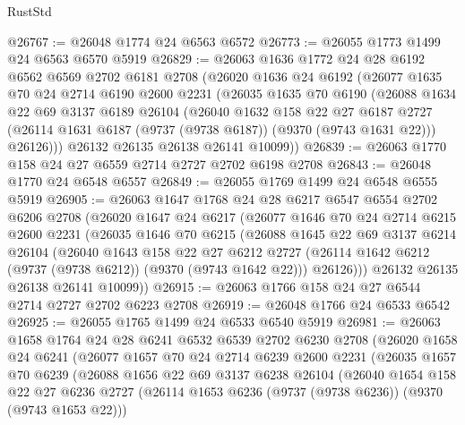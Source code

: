 \begin{lexlean}{RustStd}
\begin{coremodule}
@26767 := @26048 @1774 @24 @6563 @6572
@26773 := @26055 @1773 @1499 @24 @6563 @6570 @5919
@26829 := @26063
    @1636
    @1772
    @24
    @28
    @6192
    @6562
    @6569
    @2702
    @6181
    @2708
    (@26020
      @1636
      @24
      @6192
      (@26077
        @1635
        @70
        @24
        @2714
        @6190
        @2600
        @2231
        (@26035
          @1635
          @70
          @6190
          (@26088
            @1634
            @22
            @69
            @3137
            @6189
            @26104
            (@26040
              @1632
              @158
              @22
              @27
              @6187
              @2727
              (@26114 @1631 @6187 (@9737 (@9738 @6187)) (@9370 (@9743 @1631 @22)))
              @26126)))
        @26132
        @26135
        @26138
        @26141
        @10099))
@26839 := @26063 @1770 @158 @24 @27 @6559 @2714 @2727 @2702 @6198 @2708
@26843 := @26048 @1770 @24 @6548 @6557
@26849 := @26055 @1769 @1499 @24 @6548 @6555 @5919
@26905 := @26063
    @1647
    @1768
    @24
    @28
    @6217
    @6547
    @6554
    @2702
    @6206
    @2708
    (@26020
      @1647
      @24
      @6217
      (@26077
        @1646
        @70
        @24
        @2714
        @6215
        @2600
        @2231
        (@26035
          @1646
          @70
          @6215
          (@26088
            @1645
            @22
            @69
            @3137
            @6214
            @26104
            (@26040
              @1643
              @158
              @22
              @27
              @6212
              @2727
              (@26114 @1642 @6212 (@9737 (@9738 @6212)) (@9370 (@9743 @1642 @22)))
              @26126)))
        @26132
        @26135
        @26138
        @26141
        @10099))
@26915 := @26063 @1766 @158 @24 @27 @6544 @2714 @2727 @2702 @6223 @2708
@26919 := @26048 @1766 @24 @6533 @6542
@26925 := @26055 @1765 @1499 @24 @6533 @6540 @5919
@26981 := @26063
    @1658
    @1764
    @24
    @28
    @6241
    @6532
    @6539
    @2702
    @6230
    @2708
    (@26020
      @1658
      @24
      @6241
      (@26077
        @1657
        @70
        @24
        @2714
        @6239
        @2600
        @2231
        (@26035
          @1657
          @70
          @6239
          (@26088
            @1656
            @22
            @69
            @3137
            @6238
            @26104
            (@26040
              @1654
              @158
              @22
              @27
              @6236
              @2727
              (@26114 @1653 @6236 (@9737 (@9738 @6236)) (@9370 (@9743 @1653 @22)))

\end{coremodule}
\end{lexlean}
